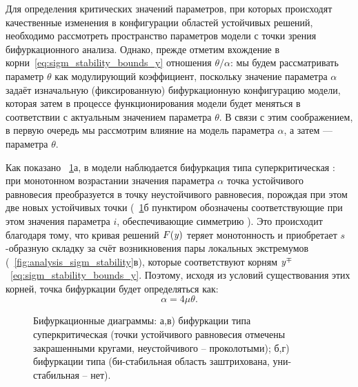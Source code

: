 Для определения критических значений параметров, при которых происходят качественные изменения в конфигурации областей устойчивых решений, необходимо рассмотреть пространство параметров модели с точки зрения бифуркационного анализа. Однако, прежде отметим вхождение в корни~\eqref{eq:sigm_stability_bounds_y} отношения $\theta/\alpha$: мы будем рассматривать параметр $\theta$ как модулирующий коэффициент, поскольку значение параметра $\alpha$ задаёт изначальную (фиксированную) бифуркационную конфигурацию модели, которая затем в процессе функционирования модели будет меняться в соответствии с актуальным значением параметра $\theta$. В связи с этим соображением, в первую очередь мы рассмотрим влияние на модель параметра $\alpha$, а затем --- параметра $\theta$.

Как показано \onfigure~\ref{fig:analysis_sigm_bifurcations}а, в модели наблюдается бифуркация типа суперкритическая : при монотонном возрастании значения параметра $\alpha$ точка устойчивого равновесия преобразуется в точку неустойчивого равновесия, порождая при этом две новых устойчивых точки (\onfigure~\ref{fig:analysis_sigm_bifurcations}б пунктиром обозначены соответствующие при этом значения параметра $i$, обеспечивающие симметрию ). Это происходит благодаря тому, что кривая решений $F(\mathit{y})$ теряет монотонность и приобретает $s$-образную складку за счёт возникновения пары локальных экстремумов (\seefigure~\ref{fig:analysis_sigm_stability}в), которые соответствуют корням $\mathit{y}^{\mp}$~\eqref{eq:sigm_stability_bounds_y}. Поэтому, исходя из условий существования этих корней, точка бифуркации будет определяться как:
\begin{equation}
    \label{eq:sigm_bifurcation_alpha}
    \alpha =  4 \mu \theta.
\end{equation}

\begin{figure}[ht]
    \caption{Бифуркационные диаграммы: а,в) бифуркации типа суперкритическая  (точки устойчивого равновесия отмечены закрашенными кругами, неустойчивого -- проколотыми); б,г) бифуркации типа  (би-стабильная область заштрихована, уни-стабильная -- нет).}
    \label{fig:analysis_sigm_bifurcations}
\end{figure}


